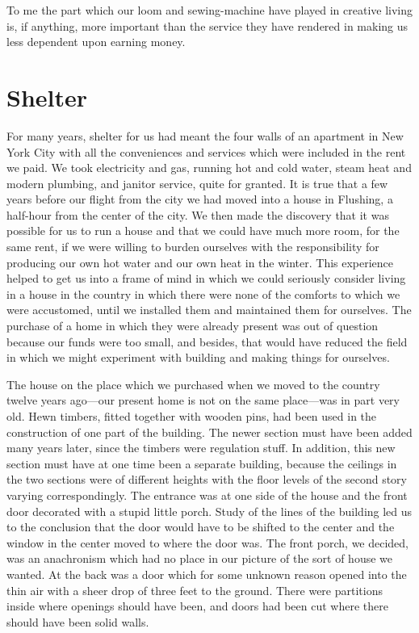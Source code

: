 \documentclass{book}
\begin{document}
To me the part which our loom and sewing-machine have played in creative living is, if anything, more important than the service they have rendered in making us less dependent upon earning money.

\chapter{Shelter}
\label{chapter-5}
For many years, shelter for us had meant the four walls of an apartment in New York City with all the conveniences and services which were included in the rent we paid. We took electricity and gas, running hot and cold water, steam heat and modern plumbing, and janitor service, quite for granted. It is true that a few years before our flight from the city we had moved into a house in Flushing, a half-hour from the center of the city. We then made the discovery that it was possible for us to run a house and that we could have much more room, for the same rent, if we were willing to burden ourselves with the responsibility for producing our own hot water and our own heat in the winter. This experience helped to get us into a frame of mind in which we could seriously consider living in a house in the country in which there were none of the comforts to which we were accustomed, until we installed them and maintained them for ourselves. The purchase of a home in which they were already present was out of question because our funds were too small, and besides, that would have reduced the field in which we might experiment with building and making things for ourselves.

The house on the place which we purchased when we moved to the country twelve years ago—our present home is not on the same place—was in part very old. Hewn timbers, fitted together with wooden pins, had been used in the construction of one part of the building. The newer section must have been added many years later, since the timbers were regulation stuff. In addition, this new section must have at one time been a separate building, because the ceilings in the two sections were of different heights with the floor levels of the second story varying correspondingly. The entrance was at one side of the house and the front door decorated with a stupid little porch. Study of the lines of the building led us to the conclusion that the door would have to be shifted to the center and the window in the center moved to where the door was. The front porch, we decided, was an anachronism which had no place in our picture of the sort of house we wanted. At the back was a door which for some unknown reason opened into the thin air with a sheer drop of three feet to the ground. There were partitions inside where openings should have been, and doors had been cut where there should have been solid walls.
\end{document}
